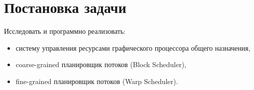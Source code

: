 \section{Постановка задачи}

Исследовать и программно реализовать:

\begin{itemize}
  \item систему управления ресурсами графического процессора общего назначения,
  \item coarse-grained планировщик потоков (Block Scheduler),
  \item fine-grained планировщик потоков (Warp Scheduler).
\end{itemize}
